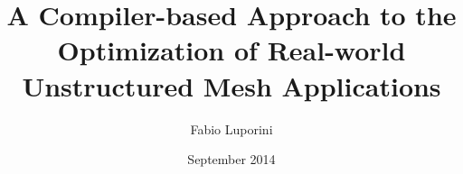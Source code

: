


\title{A Compiler-based Approach to the Optimization of Real-world Unstructured Mesh Applications}
\author{Fabio Luporini}
\date{September 2014}
\dedication{}



\maketitle






\makededication

\tableofcontents
\listoftables
\listoffigures

\mainmatter





%















